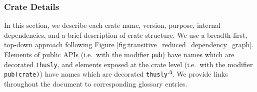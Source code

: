 \subsubsection{Crate Details}\label{sec:crate_summaries}

In this section, we describe each crate name, version, purpose, internal dependencies, and a brief description of crate structure. We use a breadth-first, top-down approach following Figure \ref{fig:transitive_reduced_dependency_graph}. Elements of public APIs (i.e.\ with the modifier \texttt{pub}) have names which are decorated \texttt{thusly}\textsuperscript{\textdagger}, and elements exposed at the crate level (i.e.\ with the modifier \texttt{pub(crate)}) have names which are decorated \texttt{thusly}\textsuperscript{$\Delta$}. We provide links throughout the document to corresponding glossary entries.


